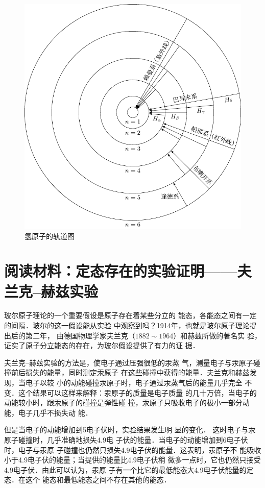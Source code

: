 \begin{figure}[htbp]
    \centering
    \includegraphics{fig/C/8-5.pdf}
    \caption{氢原子的轨道图}\label{fig_C_8-5}
\end{figure}

\section*{阅读材料：定态存在的实验证明——夫兰克--赫兹实验}
玻尔原子理论的一个重要假设是原子存在着某些分立的
能态，各能态之间有一定的间隔．玻尔的这一假设能从实验
中观察到吗？1914年，也就是玻尔原子理论提出后的第二年，
由德国物理学家夫兰克（$1882 \sim 1964$）和赫兹所做的著名实
验，证实了原子分立能态的存在，为玻尔假设提供了有力的证
据．

夫兰克--赫兹实验的方法是，使电子通过压强很低的汞蒸
气，测量电子与汞原子碰撞前后损失的能量，同时测定汞原子
在这些碰撞中获得的能量．夫兰克和赫兹发现，当电子以较
小的动能碰撞汞原子时，电子通过汞蒸气后的能量几乎完全
不变．这个结果可以这样来解释：汞原子的质量是电子质量
的几十万倍，当电子的动能较小时，跟汞原子的碰撞是弹性碰
撞，汞原子只吸收电子的极小一部分动能，电子几乎不损失动
能．

但是当电子的动能增加到5电子伏时，实验结果发生明
显的变化．
这时电子与汞原子碰撞时，几乎准确地损失4.9电
子伏的能量．当电子的动能增加到6电子伏时，电子与汞原
子碰撞也仍然只损失4.9电子伏的能量．这表明，汞原子不
能吸收小于4.9电子伏的能量；当提供的能量比4.9电子伏稍
微多一点时，它也仍然只接受4.9电子伏．由此可以认为，汞原
子有一个比它的最低能态大4.9电子伏能量的定态．在这个
能态和最低能态之间不存在其他的能态．

